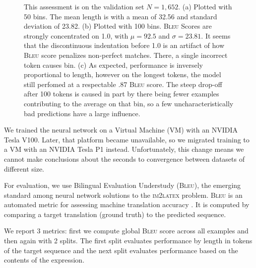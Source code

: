\documentclass[12pt]{article}
\newcommand{\BLEU}{\textsc{Bleu}}
\begin{document}
\begin{figure}[!h]
\begin{subfigure}{1.0\textwidth}
		\caption{}
	\end{subfigure}
  \caption[Model]{This assessment is on the validation set $N=1,652$. (a)
  Plotted with 50 bins. The mean length is with a mean of  32.56 and standard
  deviation of 23.82. (b) Plotted with 100 bins. \BLEU{} Scores are strongly
  concentrated on 1.0, with $\mu = 92.5$ and $\sigma = 23.81$. It seems that the
  discontinuous indentation before 1.0 is an artifact of how \BLEU{} score
  penalizes non-perfect matches. There, a single incorrect token
  causes bin. (c) As expected, performance is inversely proportional to length,
  however on the longest tokens, the model still perfomed at a respectable .87
  \BLEU{} score. The steep drop-off after 100 tokens is caused in part by there
  being fewer examples contributing to the average on that bin, so a few
  uncharacteristically bad predictions have a large influence.} 
\end{figure}

We trained the neural network on a Virtual Machine (VM) with an NVIDIA Tesla
V100. Later, that platform became unavailable, so we migrated training to a VM
with an NVIDIA Tesla P1 instead. Unfortunately, this change means we cannot make
conclusions about the seconds to convergence between datasets of different size.

For evaluation, we use Bilingual Evaluation Understudy (\BLEU{}), the emerging
standard among neural network solutions to the \textsc{im2latex} problem. \BLEU{}
is an automated metric for assessing machine translation accuracy
\cite[1]{papineni2002bleu}. It is computed by comparing a target translation
(ground truth) to the predicted sequence.

We report 3 metrics: first we compute global \BLEU{} score across all examples and
then again with 2 splits. The first split evaluates performance by length in
tokens of the target sequence and the next split evaluates performance based on
the contents of the expression.
\end{document}
